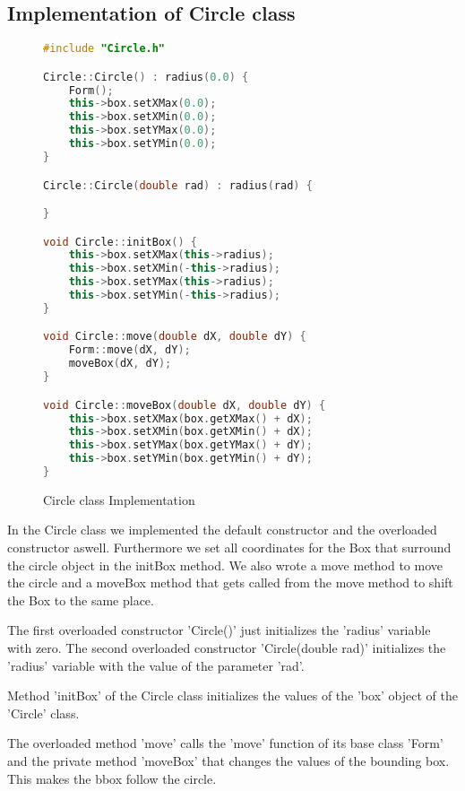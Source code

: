 \documentclass[a4paper, 10pt]{article}
\begin{document}
\subsection{Implementation of Circle class}\begin{figure}[H]
\begin{lstlisting}[language=c++]
#include "Circle.h"

Circle::Circle() : radius(0.0) {
	Form();
	this->box.setXMax(0.0);
	this->box.setXMin(0.0);
	this->box.setYMax(0.0);
	this->box.setYMin(0.0);
}

Circle::Circle(double rad) : radius(rad) {

}

void Circle::initBox() {
	this->box.setXMax(this->radius);
	this->box.setXMin(-this->radius);
	this->box.setYMax(this->radius);
	this->box.setYMin(-this->radius);
}

void Circle::move(double dX, double dY) {
	Form::move(dX, dY);
	moveBox(dX, dY);
}

void Circle::moveBox(double dX, double dY) {
	this->box.setXMax(box.getXMax() + dX);
	this->box.setXMin(box.getXMin() + dX);
	this->box.setYMax(box.getYMax() + dY);
	this->box.setYMin(box.getYMin() + dY);
}

\end{lstlisting}
\caption{Circle class Implementation}
\end{figure}
In the Circle class we implemented the default constructor and the overloaded constructor aswell. Furthermore we set all coordinates for the Box that surround the circle object in the initBox method. We also wrote a move method to move the circle and a moveBox method that gets called from the move method to shift the Box to the same place.

The first overloaded constructor 'Circle()' just initializes the 'radius' variable with zero.
The second overloaded constructor 'Circle(double rad)' initializes the 'radius' variable with the value of the parameter 'rad'.

Method 'initBox' of the Circle class initializes the values of the 'box' object of the 'Circle' class.

The overloaded method 'move' calls the 'move' function of its base class 'Form' and the private method 'moveBox' that changes the values of the bounding box. This makes the bbox follow the circle.
\end{document}
